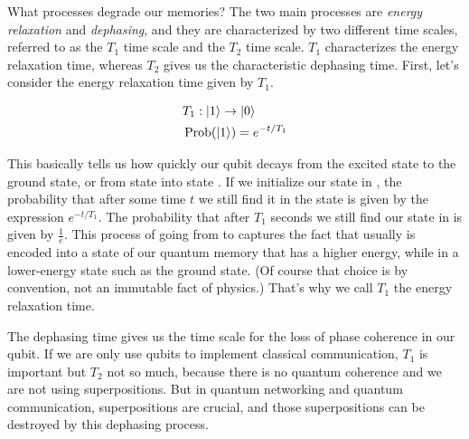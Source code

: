 What processes degrade our memories? The two main processes are \emph{energy relaxation} and \emph{dephasing}, and they are characterized by two different time scales, referred to as the $T_1$ time scale and the $T_2$ time scale.  $T_1$ characterizes the energy relaxation time, whereas $T_2$ gives us the characteristic dephasing time. First, let's consider the energy relaxation time given by $T_1$.

\begin{equation}
\begin{aligned}
&T_1:|1\rangle \rightarrow|0\rangle \\
&\operatorname{Prob}(\left| 1 \right\rangle)=e^{-t / T_1}
\end{aligned}
\end{equation}

This basically tells us how quickly our qubit decays from the excited state to the ground state, or from state  into state . If we initialize our state in , the probability that after some time $t$ we still find it in the state  is given by the expression $e^{-t/T_1}$. The probability that after $T_1$ seconds we still find our state in  is given by $\frac{1}{e}$. This process of going from  to  captures the fact that usually  is encoded into a state of our quantum memory that has a higher energy, while  in a lower-energy state such as the ground state. (Of course that choice is by convention, not an immutable fact of physics.)  That's why we call $T_1$ the energy relaxation time.

The dephasing time gives us the time scale for the loss of phase coherence in our qubit. If we are only use qubits to implement classical communication,  $T_1$ is important but  $T_2$ not so much, because there is no quantum coherence and we are not using superpositions. But in quantum networking and quantum communication, superpositions are crucial, and those superpositions can be destroyed by this dephasing process.

